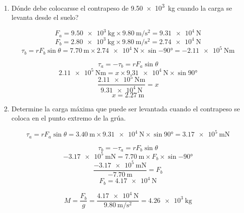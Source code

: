 \documentclass[../practica.root.tex]{subfiles}
\begin{document}
\begin{enumerate}
	      \begin{center}
	      \end{center}

	      \begin{enumerate}
		      \item Dónde debe colocarsse el contrapeso de \SI{9,50e3}{\kilogram} cuando la carga se levanta desde el suelo?

		            \[
			            F_a=\SI{9,50e3}{\kilogram}\times\SI{9,80}{\meter\per\second\squared}
			            =\SI{9,31e4}{\newton}
		            \]
		            \[
			            F_b=\SI{2,80e3}{\kilogram}\times\SI{9,80}{\meter\per\second\squared}
			            =\SI{2,74e4}{\newton}
		            \]
		            \[
			            \tau_b=rF_b\sin{\theta}
			            =\SI{7,70}{\meter}\times\SI{2,74e4}{\newton}\times\sin{\ang{-90}}
			            =\SI{-2,11e5}{\newton\meter}
		            \]

		            \[\tau_a=-\tau_b=rF_a\sin{\theta}\]
		            \[\SI{2,11e5}{\newton\meter}=x\times\SI{9,31e4}{\newton}\times\sin{\ang{90}}\]
		            \[\frac{\SI{2,11e5}{\newton\meter}}{\SI{9,31e4}{\newton}}=x\]
		            \[x=\boxed{\SI{2,27}{\meter}}\]

		      \item Determine la carga máxima que puede ser levantada cuando el contrapeso se coloca en el punto extremo de la grúa.

		            \[
			            \tau_a=rF_a\sin{\theta}
			            =\SI{3,40}{\meter}\times\SI{9,31e4}{\newton}\times\sin{\ang{90}}
			            =\SI{3,17e5}{\meter\newton}
		            \]

		            \[\tau_b=-\tau_a=rF_b\sin{\theta}\]
		            \[\SI{-3,17e5}{\meter\newton}=\SI{7,70}{\meter}\times F_b\times\sin{\ang{-90}}\]
		            \[\frac{\SI{-3,17e5}{\meter\newton}}{\SI{-7,70}{\meter}}=F_b\]
		            \[F_b=\SI{4,17e4}{\newton}\]

		            \[
			            M=\frac{F_b}{g}
			            =\frac{\SI{4,17e4}{\newton}}{\SI{9,80}{\meter\per\second\squared}}
			            =\boxed{\SI{4,26e3}{\kilogram}}
		            \]
	      \end{enumerate}
\end{enumerate}
\end{document}

